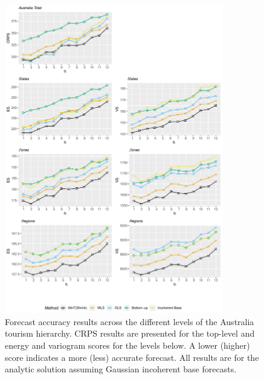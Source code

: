 \documentclass[12pt]{article}
\theoremstyle{definition}
\begin{document}
\clearpage
\begin{figure}
	\centering
	\small
	\includegraphics[width= 0.85\textwidth, height= 0.85\textheight]{Empirical-results/Results-ARIMA/RawScore_Gauss_Levels.pdf}
	\caption{Forecast accuracy results across the different levels of the Australia tourism hierarchy. CRPS results are presented for the top-level and energy and variogram scores for the levels below. A lower (higher) score indicates a more (less) accurate forecast. All results are for the analytic solution assuming Gaussian incoherent base forecasts.} \label{fig:ES-Levels}
\end{figure}





\end{document}
